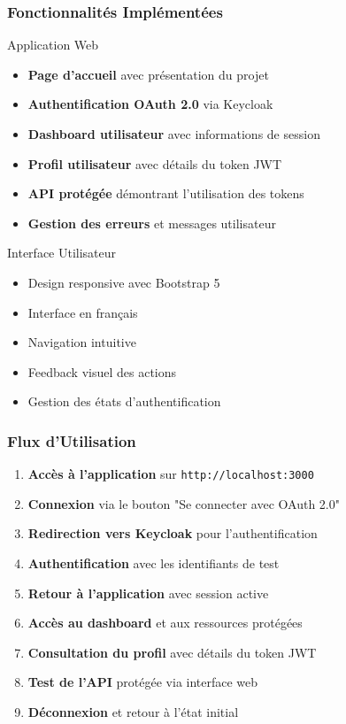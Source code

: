 \documentclass[aspectratio=169]{beamer}
\begin{document}
\begin{frame}
    \frametitle{Fonctionnalités Implémentées}
    \begin{block}{Application Web}
        \begin{itemize}
            \item \textbf{Page d'accueil} avec présentation du projet
            \item \textbf{Authentification OAuth 2.0} via Keycloak
            \item \textbf{Dashboard utilisateur} avec informations de session
            \item \textbf{Profil utilisateur} avec détails du token JWT
            \item \textbf{API protégée} démontrant l'utilisation des tokens
            \item \textbf{Gestion des erreurs} et messages utilisateur
        \end{itemize}
    \end{block}
    
    \begin{block}{Interface Utilisateur}
        \begin{itemize}
            \item Design responsive avec Bootstrap 5
            \item Interface en français
            \item Navigation intuitive
            \item Feedback visuel des actions
            \item Gestion des états d'authentification
        \end{itemize}
    \end{block}
\end{frame}

\begin{frame}
    \frametitle{Flux d'Utilisation}
    \begin{enumerate}
        \item \textbf{Accès à l'application} sur \texttt{http://localhost:3000}
        \item \textbf{Connexion} via le bouton "Se connecter avec OAuth 2.0"
        \item \textbf{Redirection vers Keycloak} pour l'authentification
        \item \textbf{Authentification} avec les identifiants de test
        \item \textbf{Retour à l'application} avec session active
        \item \textbf{Accès au dashboard} et aux ressources protégées
        \item \textbf{Consultation du profil} avec détails du token JWT
        \item \textbf{Test de l'API} protégée via interface web
        \item \textbf{Déconnexion} et retour à l'état initial
    \end{enumerate}
\end{frame}
\end{document}
